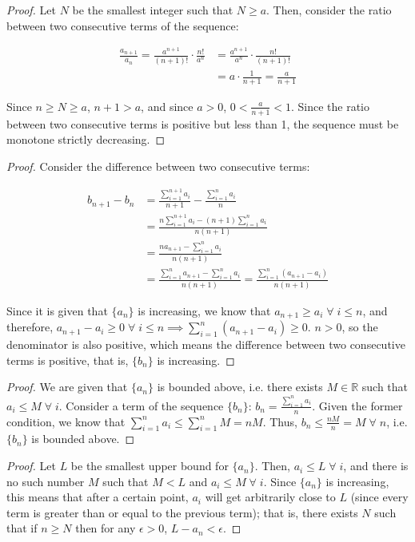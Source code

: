\begin{proof}
  Let $N$ be the smallest integer such that $N \geq a$. Then, consider the ratio between two consecutive terms of the sequence:

  \begin{align*}
    \frac{a_{n + 1}}{a_n} = \frac{a^{n + 1}}{(n + 1)!} \cdot \frac{n!}{a^n} &= \frac{a^{n + 1}}{a^n} \cdot \frac{n!}{(n + 1)!} \\
    &= a \cdot \frac{1}{n + 1} = \frac{a}{n + 1}
  \end{align*}

  Since $n \geq N \geq a$, $n + 1 > a$, and since $a > 0$, $0 < \frac{a}{n + 1} < 1$. Since the ratio between two consecutive terms is positive but less than 1, the sequence must be monotone strictly decreasing.
\end{proof}


\begin{proof}
  Consider the difference between two consecutive terms:

  \begin{align*}
    b_{n + 1} - b_n &= \frac{\sum_{i = 1}^{n + 1} a_i}{n + 1} - \frac{\sum_{i = 1}^{n} a_i}{n} \\
    &= \frac{n\sum_{i = 1}^{n + 1} a_i - (n + 1)\sum_{i = 1}^{n} a_i}{n(n + 1)} \\
    &= \frac{na_{n + 1} - \sum_{i = 1}^{n} a_i}{n(n + 1)} \\
    &= \frac{\sum_{i = 1}^{n}a_{n + 1} - \sum_{i = 1}^{n} a_i}{n(n + 1)} = \frac{\sum_{i = 1}^{n}(a_{n + 1} - a_i)}{n(n + 1)}
  \end{align*}

  Since it is given that $\{a_n\}$ is increasing, we know that $a_{n + 1} \geq a_i \;\forall\; i \leq n$, and therefore, $a_{n + 1} - a_i \geq 0 \;\forall\; i \leq n \implies \sum_{i = 1}^{n}(a_{n + 1} - a_i) \geq 0$. $n > 0$, so the denominator is also positive, which means the difference between two consecutive terms is positive, that is, $\{b_n\}$ is increasing.
\end{proof}

\begin{proof}
  We are given that $\{a_n\}$ is bounded above, i.e. there exists $M \in \mathbb{R}$ such that $a_i \leq M \;\forall\; i$. Consider a term of the sequence $\{b_n\}$: $b_n = \frac{\sum_{i = 1}^n a_i}{n}$. Given the former condition, we know that $\sum_{i = 1}^n a_i \leq \sum_{i = 1}^n M = nM$. Thus, $b_n \leq \frac{nM}{n} = M \;\forall\; n$, i.e. $\{b_n\}$ is bounded above.
\end{proof}

\begin{proof}
  Let $L$ be the smallest upper bound for $\{a_n\}$. Then, $a_i \leq L \;\forall\; i$, and there is no such number $M$ such that $M < L$ and  $a_i \leq M \;\forall\; i$. Since $\{a_n\}$ is increasing, this means that after a certain point, $a_i$ will get arbitrarily close to $L$ (since every term is greater than or equal to the previous term); that is, there exists $N$ such that if $n \geq N$ then for any $\epsilon > 0$, $L - a_n < \epsilon$.
\end{proof}


